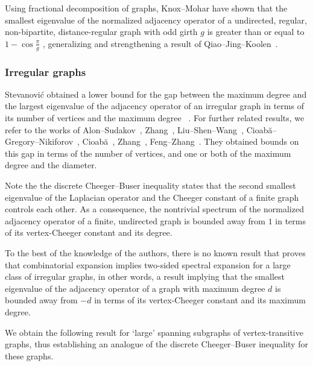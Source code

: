 \documentclass[ALCO,Unicode,published]{cedram}
\begin{document}
Using fractional decomposition of graphs, Knox--Mohar have shown that the smallest eigenvalue of the normalized adjacency operator of a undirected, regular, non-bipartite, distance-regular graph with odd girth $g$ is greater than or equal to $1 - \cos \frac \pi g$ 
\cite[Corollary 5]{KnoxMoharFractionalDecomSmallestEigenVal}, generalizing and strengthening a result of Qiao--Jing--Koolen~\cite[Theorem 1]{QiaoJingKoolenNonBipartiteDistRegular}.


\subsubsection{Irregular graphs}
\label{Subsubsec:IrregularGraphs}

Stevanovi\'{c} obtained a lower bound for the gap between the maximum degree and the largest eigenvalue of the adjacency operator of an irregular graph in terms of its number of vertices and the maximum degree ~\cite{StevanovicLargestEigenValueNonregGraphs}. 
For further related results, we refer to the works of 
Alon--Sudakov~\cite{AlonSudakovBipartiteSubgraphsSmallestEigenVal}, 
 Zhang~\cite{ZhangEigenVectEigenValNonRegGraph}, Liu--Shen--Wang~\cite{LiuShenWangLargestEigenValNonRegGraph}, Cioab\u{a}--Gregory--Nikiforov~\cite{CioabaGregoryNikiforovExtremeEigenvalNonRegGraph}, Cioab\u{a}~\cite{CioabaSpecRedMaxDegIrrGraphs}, Zhang~\cite{ZhangNewResultSpecRadiusIrregGraph}, Feng--Zhang~\cite{FengZhangNoteSpectralRadiusMaxDegreeIrreg}. They obtained bounds on this gap in terms of the number of vertices, and one or both of the maximum degree and the diameter. 

Note the the discrete Cheeger--Buser inequality states that the second smallest eigenvalue of the Laplacian operator and the Cheeger constant of a finite graph controls each other. As a consequence, the nontrivial spectrum of the normalized adjacency operator of a finite, undirected graph is bounded away from $1$ in terms of its vertex-Cheeger constant  and its degree. 

To the best of the knowledge of the authors, there is no known result that proves that combinatorial expansion implies two-sided spectral expansion for a large class of irregular graphs, in other words, a result implying that the smallest eigenvalue of the adjacency operator of a graph with maximum degree $d$ is bounded away from $-d$ in terms of its vertex-Cheeger constant and its maximum degree. 




We obtain the following result for `large' spanning subgraphs of vertex-transitive graphs, thus establishing an analogue of the discrete Cheeger--Buser inequality for these graphs.
\end{document}
